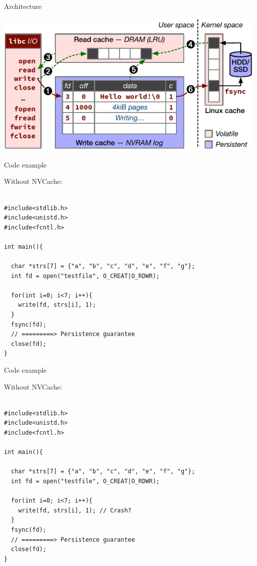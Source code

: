 \documentclass[presentation]{beamer}
\begin{document}
\begin{frame}[label={sec:orgd9686df}]{Architecture}
\begin{block}{}
\begin{center}
\includegraphics[width=.9\linewidth]{./IMGs/nvcache-model.pdf}
\end{center}
\end{block}
\end{frame}


\begin{frame}[label={sec:orgdce853e},fragile]{Code example}
 \begin{block}{Without NVCache:}
\fontsize{8pt}{10pt}\\
\begin{verbatim}

#include<stdlib.h>
#include<unistd.h>
#include<fcntl.h>

int main(){

  char *strs[7] = {"a", "b", "c", "d", "e", "f", "g"};
  int fd = open("testfile", O_CREAT|O_RDWR);

  for(int i=0; i<7; i++){
    write(fd, strs[i], 1);
  }
  fsync(fd);
  // =========> Persistence guarantee
  close(fd);
}

\end{verbatim}
\end{block}
\end{frame}

\begin{frame}[label={sec:org5a9323f},fragile]{Code example}
 \begin{block}{Without NVCache:}
\fontsize{8pt}{10pt}\\
\begin{verbatim}

#include<stdlib.h>
#include<unistd.h>
#include<fcntl.h>

int main(){

  char *strs[7] = {"a", "b", "c", "d", "e", "f", "g"};
  int fd = open("testfile", O_CREAT|O_RDWR);

  for(int i=0; i<7; i++){
    write(fd, strs[i], 1); // Crash?
  }
  fsync(fd);
  // =========> Persistence guarantee
  close(fd);
}

\end{verbatim}
\end{block}
\end{frame}
\end{document}
